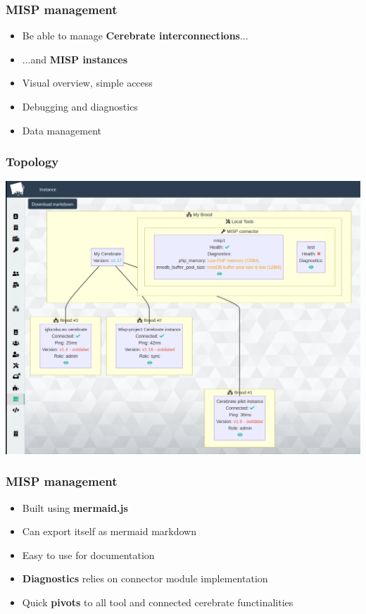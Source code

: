 \begin{frame}
\frametitle{MISP management}
    \begin{itemize}
        \item Be able to manage {\bf Cerebrate interconnections}...
        \item ...and {\bf MISP instances}
        \item Visual overview, simple access
        \item Debugging and diagnostics
        \item Data management
    \end{itemize}
\end{frame}

\begin{frame}
\frametitle{Topology}
    \begin{center}
        \includegraphics[width=1.0\linewidth]{pictures/orchestration1.png}
    \end{center}
\end{frame}

\begin{frame}
\frametitle{MISP management}
    \begin{itemize}
        \item Built using {\bf mermaid.js}
        \item Can export itself as mermaid markdown
        \item Easy to use for documentation
        \item {\bf Diagnostics} relies on connector module implementation
        \item Quick {\bf pivots} to all tool and connected cerebrate functinalities
    \end{itemize}
\end{frame}

